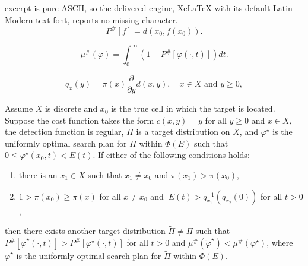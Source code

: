 \documentclass[10pt,a4paper]{amsart}
\begin{document}
excerpt is pure ASCII, so the delivered engine, XeLaTeX with its default Latin Modern text font, reports no missing character.
\begin{equation}
\label{eq:trueprob}
P^{\#}[f]=d(x_0, f(x_0)).
\end{equation}

\begin{equation}
\label{eq:truemean}
\mu^{\#} (\varphi)=\int_0^\infty(1-P^{\#}[\varphi(\cdot, t)])dt.
\end{equation}

\begin{equation}
\label{eq:rate}
q_x (y)=\pi(x)\frac{\partial }{\partial y}d(x, y), \quad x\in X \text{ and $y\geq 0$},
\end{equation}

\begin{theorem}
\label{thm:nooptdiscrete1}
Assume $X$ is discrete and $x_0$ is the true cell in which the target is located.  Suppose the cost function takes the form $c(x,y)=y$ for all $y\geq 0$ and $x \in X$,  the detection function is regular,  $\Pi$ is a target distribution on $X$, and $\varphi^\star$ is the uniformly optimal search plan for $\Pi$ within $\Phi(E)$ such that $0\leq \varphi^\star(x_0, t)<E(t)$.  If either of the following conditions holds:
\begin{enumerate}
\item[(i)]there is an $x_1\in X$ such that $x_1\neq x_0$ and $\pi(x_1)>\pi(x_0)$, 
\item[(ii)]$1>\pi(x_0)\geq \pi(x)$ for all $x\neq  x_0$ and  $\ E(t)>q_{x_1}^{-1}(q_{x_2}(0))$ for all $t>0$,
\end{enumerate}
then there exists another target distribution $\widetilde{\Pi}\neq \Pi$ such that $P^{\#}[\widetilde{\varphi}^\star(\cdot, t)]>P^{\#}[\varphi^\star(\cdot, t)]$ for all $t>0$ and $\mu^{\#}(\widetilde{\varphi}^\star)<\mu^{\#}(\varphi^\star)$, where $\widetilde{\varphi}^\star$ is the uniformly optimal search plan for $\widetilde{\Pi}$ within $\Phi(E)$.
\end{theorem}
\end{document}
